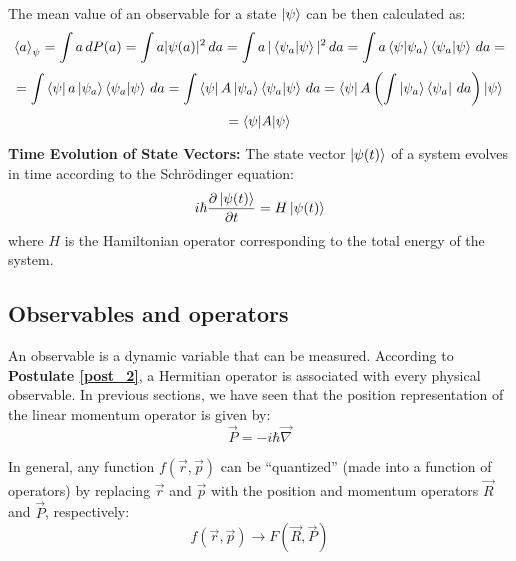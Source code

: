 \begin{postulate}
\begin{itemize}
        The mean value of an observable for a state $\ket{\psi}$ can be then calculated as:
        \begin{equation*}
            \braket{a}_\psi = \int a\, dP(a) = \int a|\psi(a)|^2\,da = \int a\,|\braket{\psi_a|\psi}|^2\,da = \int a\braket{\psi|\psi_a}\braket{\psi_a|\psi}\,da = 
        \end{equation*}
        \begin{equation*}
            = \int \bra{\psi}a\ket{\psi_a}\braket{\psi_a|\psi}\,da = \int \bra{\psi}A\ket{\psi_a}\braket{\psi_a|\psi}\,da = \bra{\psi}A\left(\int\ket{\psi_a}\bra{\psi_a}\,da\right)\ket{\psi}
        \end{equation*}
        \begin{equation}
            = \braket{\psi|A|\psi}
        \end{equation}

    \end{itemize}
\end{postulate}

\begin{postulate} \label{post_5}
    \textbf{Time Evolution of State Vectors:} The state vector $\ket{\psi(t)}$ of a system evolves in time according to the Schrödinger equation:
    \begin{equation}
        i\hbar\frac{\partial \ket{\psi(t)}}{\partial t} = H\ket{\psi(t)}
    \end{equation}
    where $H$ is the Hamiltonian operator corresponding to the total energy of the system.
\end{postulate}

\subsection{Observables and operators}

An observable is a dynamic variable that can be measured. According to \textbf{Postulate \ref{post_2}}, a Hermitian operator is associated with every physical observable. In previous sections, we have seen that the position representation of the linear momentum operator is given by:
\begin{equation}
    \vec{P} = -i\hbar\vec{\nabla}
\end{equation}

In general, any function $f(\vec{r}, \vec{p})$ can be ``quantized'' (made into a function of operators) by replacing $\vec{r}$ and $\vec{p}$ with the position and momentum operators $\vec{R}$ and $\vec{P}$, respectively:
\begin{equation}
    f(\vec{r}, \vec{p}) \rightarrow F(\vec{R}, \vec{P})
\end{equation}

